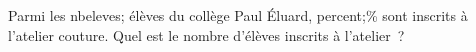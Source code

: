 \documentclass[exercice]{thedocument}%
\begin{document}
%
Parmi les \<nbeleves; élèves du collège Paul Éluard, \<percent;\% sont inscrits à l'atelier
couture.\vskip10pt Quel est le nombre d'élèves inscrits à l'atelier~?
\end{document}
